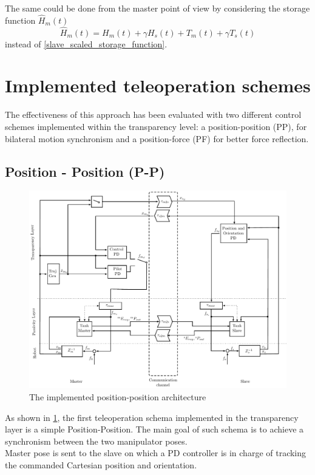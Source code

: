 The same could be done from the master point of view by considering the storage function $\hat{H}_{m}(t)$
	\begin{equation}
\hat{H}_{m}(t) = H_{m}(t) + \gamma H_{s}(t) + T_{m}(t) + \gamma T_{s}(t)
\end{equation}
instead of \eqref{slave_scaled_storage_function}.
\section{Implemented teleoperation schemes}
The effectiveness of this approach has been evaluated with two different control schemes implemented within the transparency level: a position-position (PP), for bilateral motion synchronism and a position-force (PF) for better force reflection. 
\subsection{Position - Position (P-P)}\label{PP_architecture}
\begin{figure}
	\includegraphics[width=\linewidth]{schemas/TwoLayerPPok.pdf}
	\caption[The implemented P-P architecture]{The implemented position-position architecture}
	\label{sch:TwoLayerPP}
\end{figure}
As shown in \figurename{ \ref{sch:TwoLayerPP}}, the first teleoperation schema implemented in the transparency layer is a simple Position-Position.
The main goal of such schema is to achieve a synchronism between the two manipulator poses.\\
Master pose is sent to the slave on which a PD controller is in charge of tracking the commanded Cartesian position and orientation.
